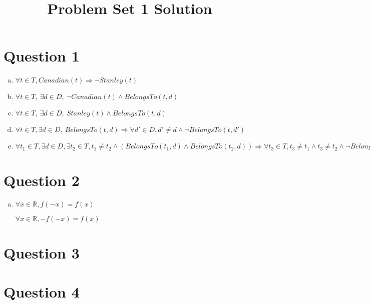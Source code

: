 \documentclass[12pt]{article}
\begin{document}
\title{Problem Set 1 Solution}
\maketitle

\section*{Question 1}
\begin{enumerate}[a.]
    \item $\forall t \in T, Canadian(t) \Rightarrow \neg Stanley(t)$
    \item $\forall t \in T,\:\exists d \in D,\:\neg Canadian(t) \land BelongsTo(t,d)$
    \item $\forall t \in T,\:\exists d \in D,\:Stanley(t) \land BelongsTo(t,d)$
    \item $\forall t \in T, \exists d \in D,\:BelongsTo(t,d) \Rightarrow \forall d' \in D, d' \neq d \land \neg BelongsTo(t,d')$
    \item $\forall t_1 \in T, \exists d \in D, \exists t_2 \in T, t_1 \neq t_2 \land (BelongsTo(t_1, d) \land BelongsTo(t_2,d)) \Rightarrow \forall t_3 \in T, t_3 \neq t_1 \land t_3 \neq t_2 \land \neg BelongsTo(t_3, d)$
\end{enumerate}

\section*{Question 2}
\begin{enumerate}[a.]
    \item
    $\forall x \in \mathbb{R}, f(-x) = f(x)$

    $\forall x \in \mathbb{R}, -f(-x) = f(x)$

\end{enumerate}

\section*{Question 3}

\section*{Question 4}
\end{document}
